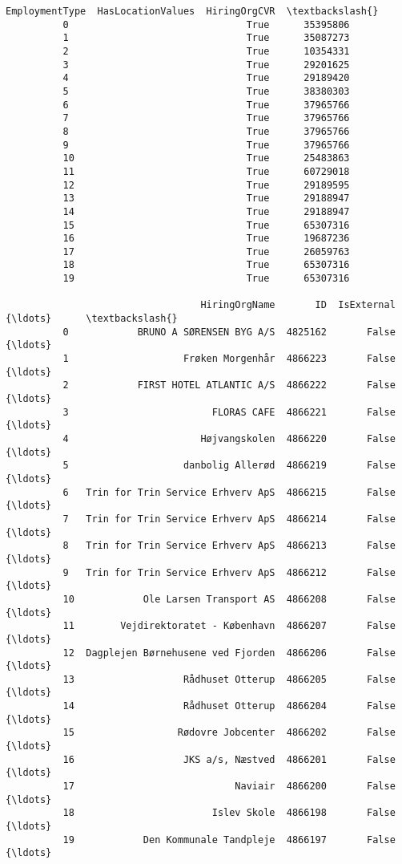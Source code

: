 \documentclass[11pt]{article}
\begin{document}
\begin{Verbatim}[commandchars=\\\{\}]
             EmploymentType  HasLocationValues  HiringOrgCVR  \textbackslash{}
          0                               True      35395806   
          1                               True      35087273   
          2                               True      10354331   
          3                               True      29201625   
          4                               True      29189420   
          5                               True      38380303   
          6                               True      37965766   
          7                               True      37965766   
          8                               True      37965766   
          9                               True      37965766   
          10                              True      25483863   
          11                              True      60729018   
          12                              True      29189595   
          13                              True      29188947   
          14                              True      29188947   
          15                              True      65307316   
          16                              True      19687236   
          17                              True      26059763   
          18                              True      65307316   
          19                              True      65307316   
          
                                  HiringOrgName       ID  IsExternal     {\ldots}      \textbackslash{}
          0            BRUNO A SØRENSEN BYG A/S  4825162       False     {\ldots}       
          1                    Frøken Morgenhår  4866223       False     {\ldots}       
          2            FIRST HOTEL ATLANTIC A/S  4866222       False     {\ldots}       
          3                         FLORAS CAFE  4866221       False     {\ldots}       
          4                       Højvangskolen  4866220       False     {\ldots}       
          5                    danbolig Allerød  4866219       False     {\ldots}       
          6   Trin for Trin Service Erhverv ApS  4866215       False     {\ldots}       
          7   Trin for Trin Service Erhverv ApS  4866214       False     {\ldots}       
          8   Trin for Trin Service Erhverv ApS  4866213       False     {\ldots}       
          9   Trin for Trin Service Erhverv ApS  4866212       False     {\ldots}       
          10            Ole Larsen Transport AS  4866208       False     {\ldots}       
          11        Vejdirektoratet - København  4866207       False     {\ldots}       
          12  Dagplejen Børnehusene ved Fjorden  4866206       False     {\ldots}       
          13                   Rådhuset Otterup  4866205       False     {\ldots}       
          14                   Rådhuset Otterup  4866204       False     {\ldots}       
          15                  Rødovre Jobcenter  4866202       False     {\ldots}       
          16                   JKS a/s, Næstved  4866201       False     {\ldots}       
          17                            Naviair  4866200       False     {\ldots}       
          18                        Islev Skole  4866198       False     {\ldots}       
          19            Den Kommunale Tandpleje  4866197       False     {\ldots}       
          

\end{Verbatim}
\end{document}
